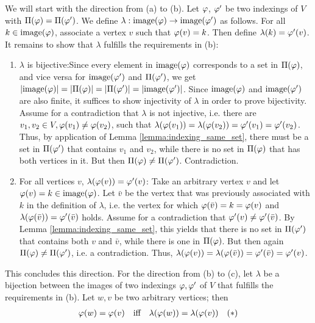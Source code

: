 \begin{appendixproof}
    We will start with the direction from (a) to (b). Let $\varphi$, $\varphi'$ be two indexings of $V$ with $\Pi(\varphi) = \Pi(\varphi')$. We define $\lambda : \mathrm{image}(\varphi)\rightarrow \mathrm{image}(\varphi')$ as follows. For all $k \in \mathrm{image}(\varphi)$, associate a vertex $v$ such that $\varphi(v)=k$. Then define $\lambda(k)=\varphi'(v)$. It remains to show that $\lambda$ fulfills the requirements in (b):
    \begin{enumerate}
        \item $\lambda$ is bijective:\quad Since every element in $\mathrm{image}(\varphi)$ corresponds to a set in $\Pi(\varphi)$, and vice versa for $\mathrm{image}(\varphi')$ and $\Pi(\varphi')$, we get $|\mathrm{image}(\varphi)|=|\Pi(\varphi)|=|\Pi(\varphi')|=|\mathrm{image}(\varphi')|$. Since $\mathrm{image}(\varphi)$ and $\mathrm{image}(\varphi')$ are also finite, it suffices to show injectivity of $\lambda$ in order to prove bijectivity. Assume for a contradiction that $\lambda$ is not injective, i.e. there are $v_1,v_2 \in V, \varphi(v_1) \neq \varphi(v_2)$, such that $\lambda(\varphi(v_1))=\lambda(\varphi(v_2))=\varphi'(v_1)=\varphi'(v_2)$. Thus, by application of Lemma \ref{lemma:indexing_same_set}, there must be a set in $\Pi(\varphi')$ that contains $v_1$ and $v_2$, while there is no set in $\Pi(\varphi)$ that has both vertices in it. But then $\Pi(\varphi)\neq \Pi(\varphi')$. Contradiction.
        \item For all vertices $v$, $\lambda(\varphi(v)) = \varphi'(v)$: \quad Take an arbitrary vertex $v$ and let $\varphi(v) = k \in \mathrm{image}(\varphi)$. Let $\bar{v}$ be the vertex that was previously associated with $k$ in the definition of $\lambda$, i.e. the vertex for which $\varphi(\bar{v})=k = \varphi(v)$ and $\lambda(\varphi(\bar{v}))=\varphi'(\bar{v})$ holds. Assume for a contradiction that $\varphi'(v)\neq \varphi'(\bar{v})$. By Lemma \ref{lemma:indexing_same_set}, this yields that there is no set in $\Pi(\varphi')$ that contains both $v$ and $\bar{v}$, while there is one in $\Pi(\varphi)$. But then again $\Pi(\varphi) \neq \Pi(\varphi')$, i.e. a contradiction. Thus, $\lambda(\varphi(v)) = \lambda(\varphi(\bar{v})) = \varphi'(\bar{v}) = \varphi'(v)$. 
    \end{enumerate}
    This concludes this direction. For the direction from (b) to (c), let $\lambda$ be a bijection between the images of two indexings $\varphi, \varphi'$ of $V$ that fulfills the requirements in (b). Let $w,v$ be two arbitrary vertices; then
    \begin{align*}
        \idx(w) = \idx(v) &\quad\text{iff}\quad \lambda(\idx(w)) = \lambda(\idx(v)) &(*) \\ 

\end{align*}
\end{appendixproof}
